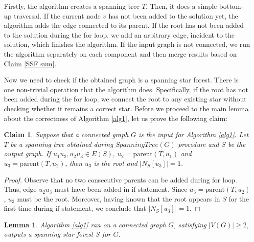 \documentclass[en]{pracamgr}
\newtheorem{lemma}{Lemma}
\newtheorem{claim}{Claim}
\begin{document}
Firstly, the algorithm creates a spanning tree $T$. Then, it does a simple bottom-up traversal. If the current node $v$ has not been added to the solution yet, the algorithm adds the edge connected to its parent. If the root has not been added to the solution during the for loop, we add an arbitrary edge, incident to the solution, which finishes the algorithm. If the input graph is not connected, we run the algorithm separately on each component and then merge results based on Claim \ref{SSF sum}.

Now we need to check if the obtained graph is a spanning star forest. There is one non-trivial operation that the algorithm does. Specifically, if the root has not  been added during the for loop, we connect the root to any existing star without checking whether it remains a correct star. Before we proceed to the main lemma about the correctness of Algorithm \ref{alg1}, let us prove the following claim:

\begin{claim}\label{ssf root}
	Suppose that a connected graph $G$ is the input for Algorithm \ref{alg1}. Let $T$ be a spanning tree obtained during $SpanningTree(G)$ procedure and $S$ be the output graph. If $u_1 u_2,u_2 u_3 \in E(S)$, $u_2 = \textrm{parent}(T,u_1)$ and $u_3=\textrm{parent}(T,u_2)$, then $u_3$ is the root and $|N_S[u_3]|=1$.
\end{claim}

\begin{proof}
	Observe that no two consecutive parents can be added during for loop. Thus, edge $u_2 u_3$ must have been added in if statement. Since $u_3 = \textrm{parent}(T,u_2)$, $u_3$ must be the root. Moreover, having known that the root appears in $S$ for the first time during if statement, we conclude that $|N_S[u_3]|=1$. 
\end{proof}

\begin{lemma}\label{alg1 correctness}
	Algorithm \ref{alg1} ran on a connected graph $G$, satisfying $|V(G)| \geq 2$, outputs a spanning star forest $S$ for $G$.
\end{lemma}
\end{document}
